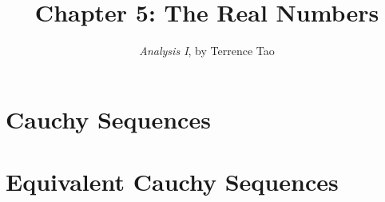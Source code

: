 \documentclass{extarticle}
\title{\vspace{-2em}Chapter 5: The Real Numbers}
\author{\emph{Analysis I}, by Terrence Tao}
\date{}
\begin{document}
\maketitle



\section{Cauchy Sequences}


\section{Equivalent Cauchy Sequences}

\break
\end{document}
